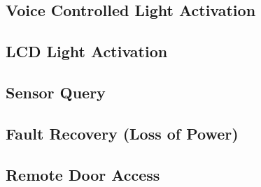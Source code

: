 \tbw

\subsection{Voice Controlled Light Activation}

\subsection{LCD Light Activation}

\subsection{Sensor Query}

\subsection{Fault Recovery (Loss of Power)}

\subsection{Remote Door Access}
\label{sec:demo-door}
